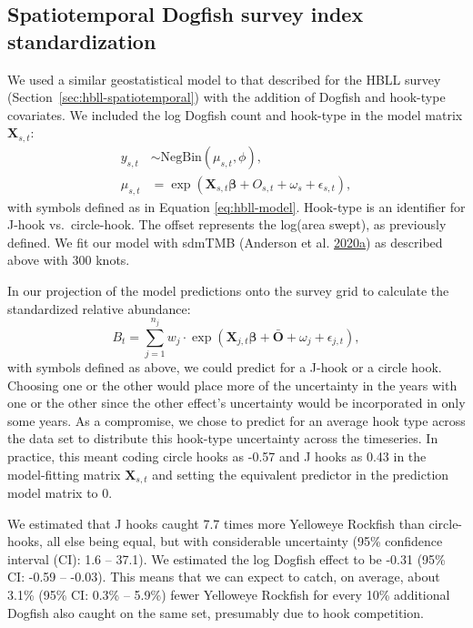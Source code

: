 \documentclass[11pt]{book}
\begin{document}
\hypertarget{sec:dog-index-model}{%
\subsection{Spatiotemporal Dogfish survey index standardization}\label{sec:dog-index-model}}

We used a similar geostatistical model to that described for the HBLL survey (Section~\ref{sec:hbll-spatiotemporal}) with the addition of Dogfish and hook-type covariates. We included the log Dogfish count and hook-type in the model matrix \(\bm{X}_{s,t}\):
\begin{align}
  y_{s,t} &\sim \mathrm{NegBin}(\mu_{s,t}, \phi),\\
  \mu_{s,t} &= \exp \left( \bm{X}_{s,t} \bm{\beta} + O_{s,t} + \omega_s + \epsilon_{s,t} \right),
\label{eq:dogfish-model}
\end{align}
with symbols defined as in Equation \eqref{eq:hbll-model}. Hook-type is an identifier for J-hook vs.~circle-hook. The offset represents the log(area swept), as previously defined. We fit our model with sdmTMB (Anderson et al. \protect\hyperlink{ref-sdmtmb}{2020}\protect\hyperlink{ref-sdmtmb}{a}) as described above with 300 knots.

In our projection of the model predictions onto the survey grid to calculate the standardized relative abundance:
\begin{equation}
B_t = \sum_{j = 1}^{n_j}
  w_j \cdot \exp \left( \bm{X}_{j,t} \bm{\beta} + \bar{\bm{O}} + \omega_j + \epsilon_{j,t} \right),
\label{eq:dog-prediction}
\end{equation}
with symbols defined as above, we could predict for a J-hook or a circle hook. Choosing one or the other would place more of the uncertainty in the years with one or the other since the other effect's uncertainty would be incorporated in only some years. As a compromise, we chose to predict for an average hook type across the data set to distribute this hook-type uncertainty across the timeseries. In practice, this meant coding circle hooks as -0.57 and J hooks as 0.43 in the model-fitting matrix \(\bm{X}_{s,t}\) and setting the equivalent predictor in the prediction model matrix to 0.

We estimated that J hooks caught 7.7 times more Yelloweye Rockfish than circle-hooks, all else being equal, but with considerable uncertainty (95\% confidence interval (CI): 1.6 -- 37.1). We estimated the log Dogfish effect to be -0.31 (95\% CI: -0.59 -- -0.03). This means that we can expect to catch, on average, about 3.1\% (95\% CI: 0.3\% -- 5.9\%) fewer Yelloweye Rockfish for every 10\% additional Dogfish also caught on the same set, presumably due to hook competition.
\end{document}
